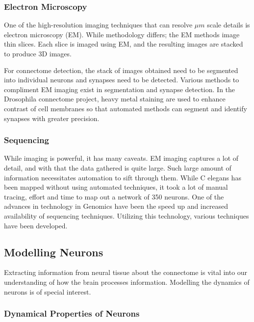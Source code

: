 \documentclass[../dissertation.tex]{subfiles}
\begin{document}
\subsubsection{Electron Microscopy}

One of the high-resolution imaging techniques that can resolve $\mu m$ scale details is electron microscopy (EM).
While methodology differs; the EM methods image thin slices.
Each slice is imaged using EM, and the resulting images are stacked to produce 3D images.

For connectome detection, the stack of images obtained need to be segmented into individual neurons and synapses need to be detected.
Various methods to compliment EM imaging exist in segmentation and synapse detection.
In the Drosophila connectome project, heavy metal staining are used to enhance contrast of cell membranes so that automated methods can segment and identify synapses with greater precision.~\cite{Scheffer.etal2020}

\subsubsection{Sequencing}

While imaging is powerful, it has many caveats.
EM imaging captures a lot of detail, and with that the data gathered is quite large.
Such large amount of information necessitates automation to sift through them.
While C elegans has been mapped without using automated techniques, it took a lot of manual tracing, effort and time to map out a network of 350 neurons.
One of the advances in technology in Genomics have been the speed up and increased availability of sequencing techniques.
Utilizing this technology, various techniques have been developed.~\cite{Zador.etal2012}

\subsection{Modelling Neurons} \label{sec:intro-ann}

Extracting information from neural tissue about the connectome is vital into our understanding of how the brain processes information.
Modelling the dynamics of neurons is of special interest.

\subsubsection{Dynamical Properties of Neurons}
\end{document}
